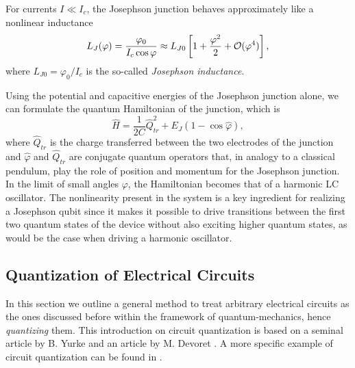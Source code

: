 \smallskip

For currents $I\ll I_c$, the Josephson junction behaves approximately like a nonlinear inductance
%
\begin{equation}
L_J(\varphi) = \frac{\varphi_0}{I_c \cos{\varphi}} \approx L_{J0}\left[1+\frac{\varphi^2}{2}+\begin{mathcal}O\end{mathcal}(\varphi^4)\right],\label{eq:josephson_inductance}
\end{equation}
%
where $L_{J0}=\varphi_0/ I_c$ is the so-called {\it Josephson inductance}. 

\smallskip

Using the potential and capacitive energies of the Josephson junction alone, we can formulate the quantum Hamiltonian of the junction, which is
%
\begin{equation}
\hat{H} = \frac{1}{2C}\hat{Q}^2_{tr}+E_J(1-\cos{\hat{\varphi}}),
\end{equation}
%
where $\hat{Q}_{tr}$ is the charge transferred between the two electrodes of the junction and $\hat{\varphi}$ and $\hat{Q}_{tr}$ are conjugate quantum operators that, in analogy to a classical pendulum, play the role of position and momentum for the Josephson junction. In the limit of small angles $\varphi$, the Hamiltonian becomes that of a harmonic LC oscillator. The nonlinearity present in the system is a key ingredient for realizing a Josephson qubit since it makes it possible to drive transitions between the first two quantum states of the device without also exciting higher quantum states, as would be the case when driving a harmonic oscillator.

\subsection{Quantization of Electrical Circuits}

In this section we outline a general method to treat arbitrary electrical circuits as the ones discussed before within the framework of quantum-mechanics, hence {\it quantizing} them. This introduction on circuit quantization is based on a seminal article by B. Yurke \citep{yurke_quantum_1984} and an article by M. Devoret \cite{devoret_quantum_1995}. A more specific example of circuit quantization can be found in \citep{burkard_multilevel_2004}.

\smallskip

